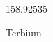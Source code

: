 \documentclass[12pt]{article}
\begin{document}
\hfill{}
\vfill
\begin{center}
  {\fontsize{50}{60}
  }

  158.92535

Terbium
\end{center}
\vfill
\end{document}
